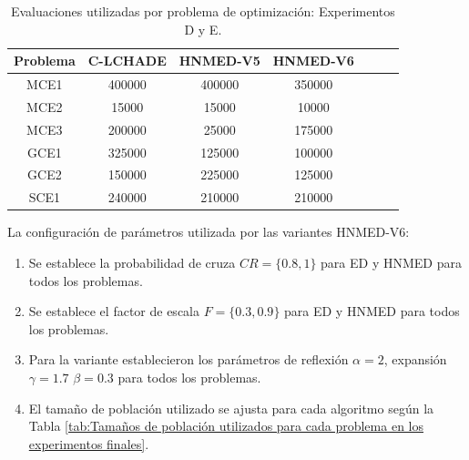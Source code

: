 \begin{table}[]
	
	\caption{Evaluaciones utilizadas por problema de optimización: Experimentos D y E.}
	\label{tab:Evaluaciones utilizadas por problema de optimización: Experimentos D y E.}
	\centering
	
	\begin{tabular}{ccccccc}
		\textbf{Problema} &   C-LCHADE     &HNMED-V5&HNMED-V6 \\
		\hline
		MCE1   &   400000 &400000 &350000   \\
		MCE2   &   15000  &15000  &10000   \\
		MCE3   &   200000 &25000  &175000  \\
		GCE1   &   325000 &125000  &100000\\
		GCE2   &   150000 &225000  &125000\\
		SCE1   &   240000 &210000  &210000\\
	\end{tabular}
	
\end{table}
La configuración de parámetros utilizada por las variantes HNMED-V6:
\begin{enumerate}
	\item Se establece la probabilidad de cruza $CR=\{0.8, 1\}$ para ED y HNMED para todos los problemas.
	\item Se establece el factor de escala $F=\{0.3, 0.9\}$ para ED y HNMED para todos los problemas.
	\item Para la variante  establecieron los parámetros de reflexión $\alpha=2$, expansión $\gamma=1.7$ $\beta=0.3$ para todos los problemas.
	\item El tamaño de población utilizado se ajusta para cada algoritmo según la Tabla \ref{tab:Tamaños de población utilizados para cada problema en los experimentos finales}. 
\end{enumerate}

